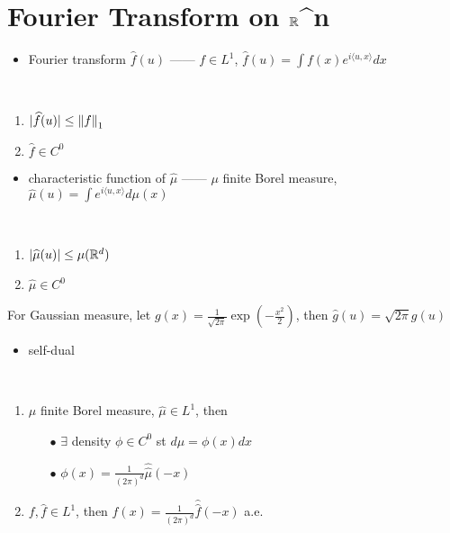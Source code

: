 \section{Fourier Transform on $\mathbb{R}$^n}\label{sec:fourier-transform-on^n}

\begin{itemize}
    \item Fourier transform $\widehat{f}(u)$ ------ $f \in L^1$, $\widehat{f}(u) = \int f(x) e^{i\langle u,x \rangle}dx$
\end{itemize}

\begin{prop}\,
    \begin{enumerate}
        \item $|\widehat{f}(u)| \leq \left\lVert f\right\rVert_1$
        \item $\widehat{f} \in C^0$
    \end{enumerate}
\end{prop}

\begin{itemize}
    \item characteristic function of $\widehat{\mu}$ ------ $\mu$ finite Borel measure, $\widehat{\mu}(u) = \int e^{i\langle u, x \rangle} d\mu(x)$
\end{itemize}

\begin{prop}\,
    \begin{enumerate}
        \item $|\widehat{\mu}(u)| \leq \mu(\mathbb{R}^d)$
        \item $\widehat{\mu} \in C^0$
    \end{enumerate}
\end{prop}

\begin{example}
    For Gaussian measure, let $g(x) = \frac{1}{\sqrt{2\pi}} \exp(-\frac{x^2}{2})$, then $\widehat{g}(u) = \sqrt{2\pi}g(u)$
\end{example}

\begin{itemize}
    \item self-dual
\end{itemize}

\begin{thm}\,
    \begin{enumerate}
        \item $\mu$ finite Borel measure, $\widehat{\mu} \in L^1$, then
        \begin{itemize}
            \item[$\bullet$] $\exists$ density $\phi \in C^0$ st $d\mu = \phi(x)dx$
            \item[$\bullet$] $\phi(x) = \frac{1}{(2\pi)^d}\widehat{\widehat{\mu}}(-x)$
        \end{itemize}
        \item $f, \widehat{f} \in L^1$, then $f(x) = \frac{1}{(2\pi)^d}\widehat{\widehat{f}}(-x)$ a.e.
    \end{enumerate}
\end{thm}